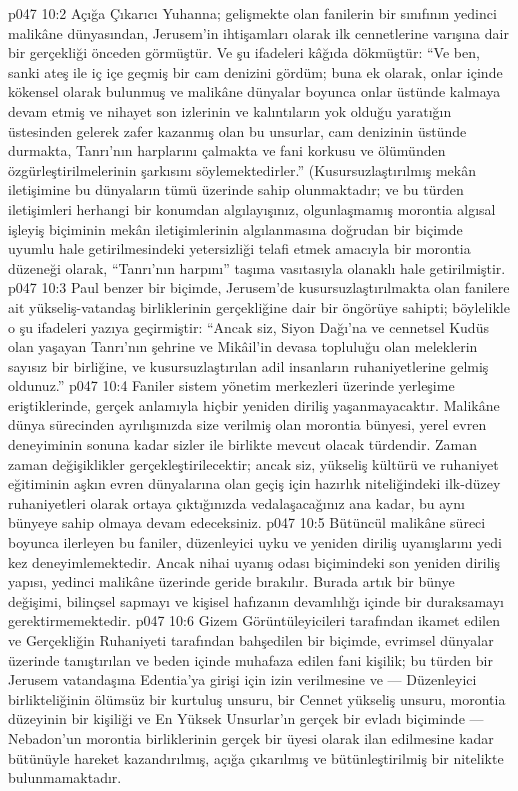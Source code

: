 \vs p047 10:2 Açığa Çıkarıcı Yuhanna; gelişmekte olan fanilerin bir sınıfının yedinci malikâne dünyasından, Jerusem’in ihtişamları olarak ilk cennetlerine varışına dair bir gerçekliği önceden görmüştür. Ve şu ifadeleri kâğıda dökmüştür: “Ve ben, sanki ateş ile iç içe geçmiş bir cam denizini gördüm; buna ek olarak, onlar içinde kökensel olarak bulunmuş ve malikâne dünyalar boyunca onlar üstünde kalmaya devam etmiş ve nihayet son izlerinin ve kalıntıların yok olduğu yaratığın üstesinden gelerek zafer kazanmış olan bu unsurlar, cam denizinin üstünde durmakta, Tanrı’nın harplarını çalmakta ve fani korkusu ve ölümünden özgürleştirilmelerinin şarkısını söylemektedirler.” (Kusursuzlaştırılmış mekân iletişimine bu dünyaların tümü üzerinde sahip olunmaktadır; ve bu türden iletişimleri herhangi bir konumdan algılayışınız, olgunlaşmamış morontia algısal işleyiş biçiminin mekân iletişimlerinin algılanmasına doğrudan bir biçimde uyumlu hale getirilmesindeki yetersizliği telafi etmek amacıyla bir morontia düzeneği olarak, “Tanrı’nın harpını” taşıma vasıtasıyla olanaklı hale getirilmiştir.
\vs p047 10:3 Paul benzer bir biçimde, Jerusem’de kusursuzlaştırılmakta olan fanilere ait yükseliş\hyp{}vatandaş birliklerinin gerçekliğine dair bir öngörüye sahipti; böylelikle o şu ifadeleri yazıya geçirmiştir: “Ancak siz, Siyon Dağı’na ve cennetsel Kudüs olan yaşayan Tanrı’nın şehrine ve Mikâil’in devasa topluluğu olan meleklerin sayısız bir birliğine, ve kusursuzlaştırılan adil insanların ruhaniyetlerine gelmiş oldunuz.”
\vs p047 10:4 Faniler sistem yönetim merkezleri üzerinde yerleşime eriştiklerinde, gerçek anlamıyla hiçbir yeniden diriliş yaşanmayacaktır. Malikâne dünya sürecinden ayrılışınızda size verilmiş olan morontia bünyesi, yerel evren deneyiminin sonuna kadar sizler ile birlikte mevcut olacak türdendir. Zaman zaman değişiklikler gerçekleştirilecektir; ancak siz, yükseliş kültürü ve ruhaniyet eğitiminin aşkın evren dünyalarına olan geçiş için hazırlık niteliğindeki ilk\hyp{}düzey ruhaniyetleri olarak ortaya çıktığınızda vedalaşacağınız ana kadar, bu aynı bünyeye sahip olmaya devam edeceksiniz.
\vs p047 10:5 Bütüncül malikâne süreci boyunca ilerleyen bu faniler, düzenleyici uyku ve yeniden diriliş uyanışlarını yedi kez deneyimlemektedir. Ancak nihai uyanış odası biçimindeki son yeniden diriliş yapısı, yedinci malikâne üzerinde geride bırakılır. Burada artık bir bünye değişimi, bilinçsel sapmayı ve kişisel hafızanın devamlılığı içinde bir duraksamayı gerektirmemektedir.
\vs p047 10:6 Gizem Görüntüleyicileri tarafından ikamet edilen ve Gerçekliğin Ruhaniyeti tarafından bahşedilen bir biçimde, evrimsel dünyalar üzerinde tanıştırılan ve beden içinde muhafaza edilen fani kişilik; bu türden bir Jerusem vatandaşına Edentia’ya girişi için izin verilmesine ve --- Düzenleyici birlikteliğinin ölümsüz bir kurtuluş unsuru, bir Cennet yükseliş unsuru, morontia düzeyinin bir kişiliği ve En Yüksek Unsurlar’ın gerçek bir evladı biçiminde --- Nebadon’un morontia birliklerinin gerçek bir üyesi olarak ilan edilmesine kadar bütünüyle hareket kazandırılmış, açığa çıkarılmış ve bütünleştirilmiş bir nitelikte bulunmamaktadır.

